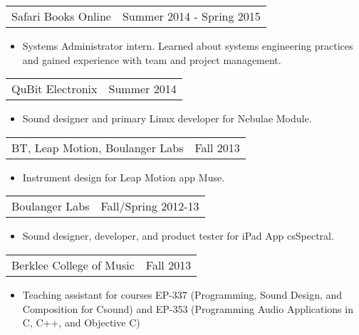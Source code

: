 \documentclass[margin]{res}
\begin{document}
\begin{resume}
\begin{tabular}{p{3in} r} %
Safari Books Online &  Summer 2014 - Spring 2015
\end{tabular}	
\begin{itemize} %
\item[] Systems Administrator intern. Learned about systems engineering 
practices and gained experience with team and project management. 
\end{itemize} 

\begin{tabular}{p{3in} r} %
QuBit Electronix&  Summer 2014
\end{tabular}	
\begin{itemize} %
\item[] Sound designer and primary Linux developer for Nebulae Module. 
\end{itemize} 

\begin{tabular}{p{3in} r} %
BT, Leap Motion, Boulanger Labs&  Fall 2013
\end{tabular}	
\begin{itemize} %
\item[] Instrument design for Leap Motion app Muse.
\end{itemize} 

\begin{tabular}{p{3in} r} %
Boulanger Labs&  Fall/Spring 2012-13
\end{tabular}	
\begin{itemize} %
\item[] Sound designer, developer, and product tester for iPad App csSpectral.
\end{itemize} 

\begin{tabular}{p{3in} r} %
Berklee College of Music&  Fall 2013
\end{tabular}	
\begin{itemize} %
\item[] Teaching assistant for courses EP-337 (Programming, Sound Design, and
Composition for Csound) and EP-353 (Programming Audio Applications in C, C++, and 
Objective C)
\end{itemize} 


\end{resume}
\end{document}
